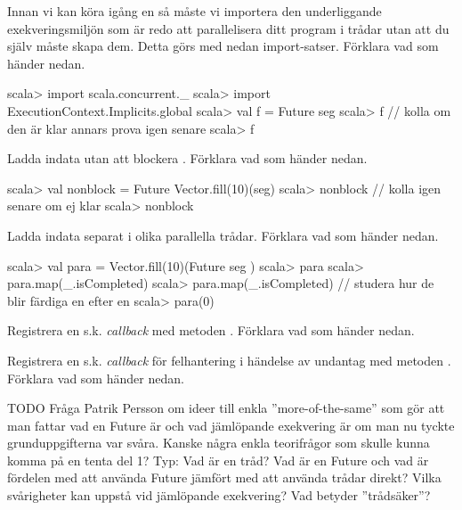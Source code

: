 \Subtask Innan vi kan köra igång en  så måste vi importera den underliggande exekveringsmiljön som är redo att parallelisera ditt program i trådar utan att du själv måste skapa dem. Detta görs med nedan import-satser. Förklara vad som händer nedan.
\begin{REPL}
scala> import scala.concurrent._ 
scala> import ExecutionContext.Implicits.global
scala> val f = Future{ seg }
scala> f   // kolla om den är klar annars prova igen senare
scala> f
\end{REPL}

\Subtask Ladda indata utan att blockera . Förklara vad som händer nedan.
\begin{REPL}
scala> val nonblock = Future{ Vector.fill(10)(seg) }
scala> nonblock   // kolla igen senare om ej klar
scala> nonblock  
\end{REPL}

\Subtask Ladda indata separat i olika parallella trådar. Förklara vad som händer nedan.
\begin{REPL}
scala> val para = Vector.fill(10)(Future{ seg })
scala> para
scala> para.map(_.isCompleted)   
scala> para.map(_.isCompleted) // studera hur de blir färdiga en efter en
scala> para(0)
\end{REPL}

\Subtask Registrera en s.k. \emph{callback} med metoden . Förklara vad som händer nedan.


\Subtask Registrera en s.k. \emph{callback} för felhantering i händelse av undantag med metoden . Förklara vad som händer nedan.


\ExtraTasks %
  
\Task TODO  Fråga Patrik Persson om ideer till enkla ''more-of-the-same'' som gör att man fattar vad en Future är och vad jämlöpande exekvering är om man nu tyckte grunduppgifterna var svåra. Kanske några enkla teorifrågor som skulle kunna komma på en tenta del 1? Typ: Vad är en tråd? Vad är en Future och vad är fördelen med att använda Future jämfört med att använda trådar direkt? Vilka svårigheter kan uppstå vid jämlöpande exekvering? Vad betyder ''trådsäker''? %


